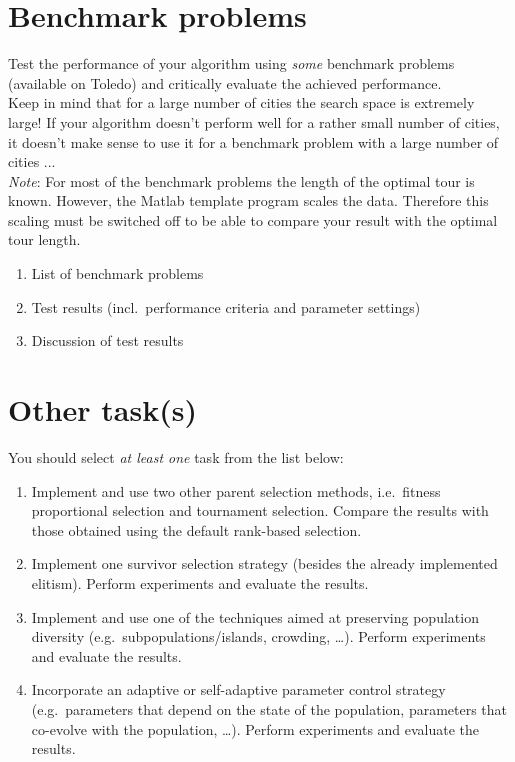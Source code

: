 \documentclass[a4paper,11pt]{article}
\begin{document}
\section{Benchmark problems}
Test the performance of your algorithm using \emph{some} benchmark problems (available on Toledo) and critically evaluate the achieved performance.\\
{\small
Keep in mind that for a large number of cities the search space is extremely large! If your algorithm doesn't perform well for a rather small number of cities, it doesn't make sense to use it for a benchmark problem with a  large number of cities ...\\
\emph{Note}: For most of the benchmark problems the length of the optimal tour is known. However, the Matlab template program scales the data. Therefore this scaling must be switched off to be able to compare your result with the optimal tour length.
}
\begin{enumerate}
\item	 List of benchmark problems
\item Test results (incl.\ performance criteria and parameter settings)
\item Discussion of test results

\end{enumerate}


\section{Other task(s)}
You should select \emph{at least one} task from the list below:
{\small
\begin{enumerate}
\item Implement and use two other parent selection methods, i.e.\  fitness proportional selection and tournament selection. Compare the results with those obtained using the default rank-based selection. 
\item Implement one survivor selection strategy (besides the already implemented elitism). Perform experiments and evaluate the results. 
\item Implement and use one of the techniques aimed at preserving population diversity (e.g.\ subpopulations/islands, crowding, \ldots). Perform experiments and evaluate the results.
\item Incorporate an adaptive or self-adaptive parameter control strategy (e.g.\  parameters that depend on the state of the population, parameters that co-evolve with the population, \ldots). Perform experiments and evaluate the results. 
\end{enumerate}
}
\end{document}
